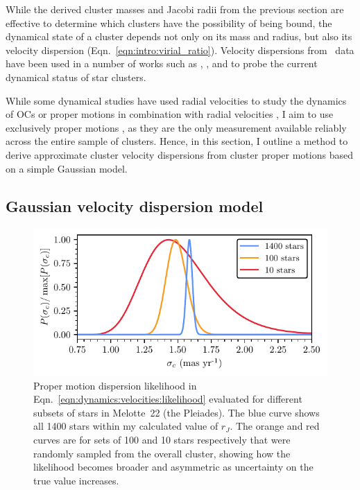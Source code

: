 While the derived cluster masses and Jacobi radii from the previous section are effective to determine which clusters have the possibility of being bound, the dynamical state of a cluster depends not only on its mass and radius, but also its velocity dispersion (Eqn.~\ref{eqn:intro:virial_ratio}). Velocity dispersions from \gaia\ data have been used in a number of works such as \cite{bravi_gaia-eso_2018}, \cite{kuhn_kinematics_2019}, and \cite{pang_3d_2021} to probe the current dynamical status of star clusters. %

While some dynamical studies have used radial velocities to study the dynamics of OCs \citep[e.g.][]{bravi_gaia-eso_2018} or proper motions in combination with radial velocities \citep[e.g.][]{evans_mass_2022-1}, I aim to use exclusively proper motions \citep[e.g. as in][]{kuhn_kinematics_2019}, as they are the only measurement available reliably across the entire sample of clusters. Hence, in this section, I outline a method to derive approximate cluster velocity dispersions from cluster proper motions based on a simple Gaussian model.


\subsection{Gaussian velocity dispersion model}
\label{sec:dynamics:velocities:model}

\begin{figure}[t]
    \centering
    \includegraphics[width=\textwidth]{fig/c4/dispersion_pdf.pdf}
    \caption[Proper motion dispersion likelihood in Eqn.~\ref{eqn:dynamics:velocities:likelihood} evaluated for different subsets of stars in Melotte~22]{Proper motion dispersion likelihood in Eqn.~\ref{eqn:dynamics:velocities:likelihood} evaluated for different subsets of stars in Melotte~22 (the Pleiades). The blue curve shows all 1400 stars within my calculated value of $r_J$. The orange and red curves are for sets of 100 and 10 stars respectively that were randomly sampled from the overall cluster, showing how the likelihood becomes broader and asymmetric as uncertainty on the true value increases.}
    \label{fig:dynamics:velocities:pdfs}
\end{figure}

